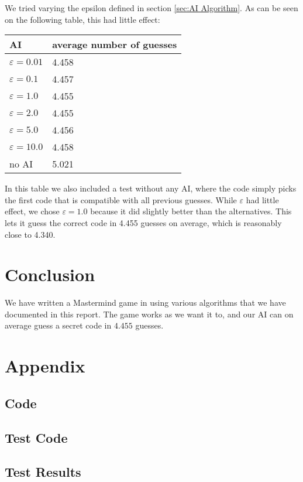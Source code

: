 \documentclass[a4paper]{article}
\begin{document}
We tried varying the epsilon defined in section \ref{sec:AI Algorithm}. As can be seen on the following table, this had little effect:

\begin{tabular}{ l | l }
AI & average number  of guesses \\
\hline
\(\varepsilon = 0.01\) & 4.458 \\
\(\varepsilon = 0.1\) & 4.457 \\
\(\varepsilon = 1.0\) & 4.455 \\
\(\varepsilon = 2.0\) & 4.455 \\
\(\varepsilon = 5.0\) & 4.456 \\
\(\varepsilon = 10.0\) & 4.458 \\
no AI & 5.021
\end{tabular}

In this table we also included a test without any AI, where the code simply picks the first code that is compatible with all previous guesses. While \(\varepsilon\) had little effect, we chose \(\varepsilon = 1.0\) because it did slightly better than the alternatives. This lets it guess the correct code in 4.455 guesses on average, which is reasonably close to 4.340.
\section{Conclusion}

We have written a Mastermind game in \Fsh using various algorithms that we have documented in this report. The game works as we want it to, and our AI can on average guess a secret code in \(4.455\) guesses.

\clearpage

\section{Appendix}

\subsection{Code}


\subsection{Test Code}


\subsection{Test Results}

\end{document}
